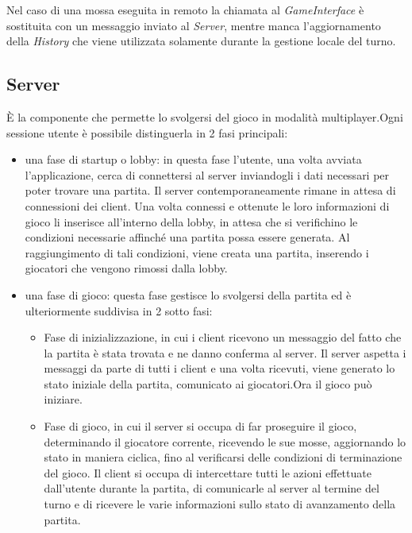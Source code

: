 Nel caso di una mossa eseguita in remoto la chiamata al \textit{GameInterface} è sostituita con un messaggio inviato al \textit{Server}, mentre manca l’aggiornamento della \textit{History} che viene utilizzata solamente durante la gestione locale del turno.
\subsection{Server}
È la componente che permette lo svolgersi del gioco in modalità multiplayer.Ogni sessione utente è possibile distinguerla in 2 fasi principali:
\begin{itemize}
    \item una fase di startup o lobby: in questa fase l’utente, una volta avviata l’applicazione, cerca di connettersi al server inviandogli i dati necessari per poter trovare una partita.
    Il server contemporaneamente rimane in attesa di connessioni dei client.
    Una volta connessi e ottenute le loro informazioni di gioco li inserisce all’interno della lobby, in attesa che si verifichino le condizioni necessarie affinché una partita possa essere generata.
    Al raggiungimento di tali condizioni, viene creata una partita, inserendo i giocatori che vengono rimossi dalla lobby.
    \item una fase di gioco: questa fase gestisce lo svolgersi della partita ed è ulteriormente suddivisa in 2 sotto fasi:
    \begin{itemize}
        \item Fase di inizializzazione, in cui i client ricevono un messaggio del fatto che la partita è stata trovata e ne danno conferma al server.
        Il server aspetta i messaggi da parte di tutti i client e una volta ricevuti, viene generato lo stato iniziale della partita, comunicato ai giocatori.Ora il gioco può iniziare.
        \item Fase di gioco, in cui il server si occupa di far proseguire il gioco, determinando il giocatore corrente, ricevendo le sue mosse, aggiornando lo stato in maniera ciclica, fino al verificarsi delle condizioni di terminazione del gioco.
        Il client si occupa di intercettare tutti le azioni effettuate dall’utente durante la partita, di comunicarle al server al termine del turno e di ricevere le varie informazioni sullo stato di avanzamento della partita.
    \end{itemize}
\end{itemize}

